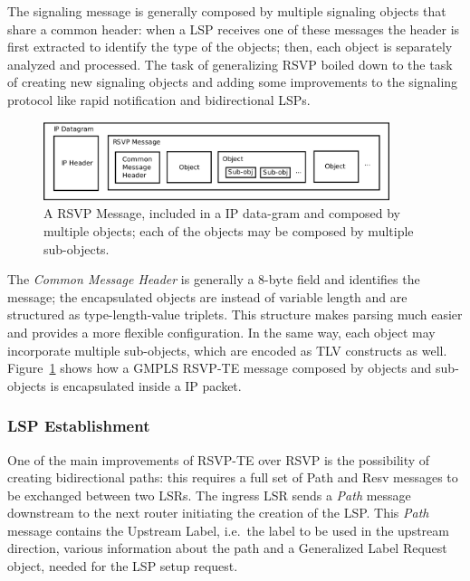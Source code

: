 \documentclass[10pt,a4paper]{report}
\begin{document}
The signaling message is generally composed by multiple signaling
objects that share a common header: when a LSP receives one of these
messages the header is first extracted to identify the type of the
objects; then, each object is separately analyzed and processed. The
task of generalizing RSVP boiled down to the task of creating new
signaling objects and adding some improvements to the signaling
protocol like rapid notification and bidirectional LSPs.

\begin{figure}[!htbp]
  \centering
  \includegraphics[width=0.9\textwidth]{img/rsvp_message}
  \caption[RSVP Message]{A RSVP Message, included in a IP data-gram
    and composed by multiple objects; each of the objects may be
    composed by multiple sub-objects.}
  \label{fig:rsvp_message}
\end{figure}

The \textit{Common Message Header} is generally a 8-byte field and
identifies the message; the encapsulated objects are instead of
variable length and are structured as type-length-value triplets. This
structure makes parsing much easier and provides a more flexible
configuration. In the same way, each object may incorporate multiple
sub-objects, which are encoded as TLV constructs as
well. Figure~\ref{fig:rsvp_message} shows how a GMPLS RSVP-TE message
composed by objects and sub-objects is encapsulated inside a IP
packet.

\subsubsection{LSP Establishment}
One of the main improvements of RSVP-TE over RSVP is the possibility
of creating bidirectional paths: this requires a full set of Path and
Resv messages to be exchanged between two LSRs. The ingress LSR sends
a \textit{Path} message downstream to the next router initiating the
creation of the LSP\@. This \textit{Path} message contains the
Upstream Label, i.e.\ the label to be used in the upstream direction,
various information about the path and a Generalized Label Request
object, needed for the LSP setup request.
\end{document}
